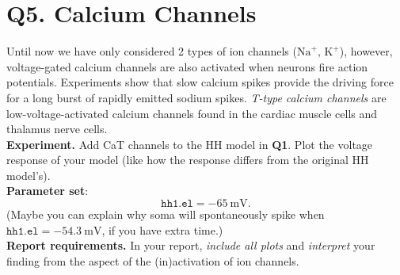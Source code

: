 \documentclass{article}
\begin{document}
\clearpage

\section*{\textbf{Q5.} Calcium Channels}

Until now we have only considered 2 types of ion channels ($\mathrm{Na}^+,\,\mathrm{K}^+$), however, voltage-gated calcium channels are also activated when neurons fire action potentials. 
Experiments show that slow calcium spikes provide the driving force for a long burst of rapidly emitted sodium spikes. 
\textit{T-type calcium channels} are low-voltage-activated calcium channels found in the cardiac muscle cells and thalamus nerve cells. \\

\noindent\textbf{Experiment.}
Add CaT channels to the HH model in \textbf{Q1}. Plot the voltage response of your model (like how the response differs from the original HH model's).\\

\noindent\textbf{Parameter set}:
\[\texttt{hh1.el}=\SI{-65}{\milli\volt}.\]
(Maybe you can explain why soma will spontaneously spike when $\texttt{hh1.el}=\SI{-54.3}{\milli\volt}$, if you have extra time.)\\

\noindent\textbf{Report requirements.}
In your report, \textit{include all plots} and \textit{interpret} your finding from the aspect of the (in)activation of ion channels.
\end{document}
